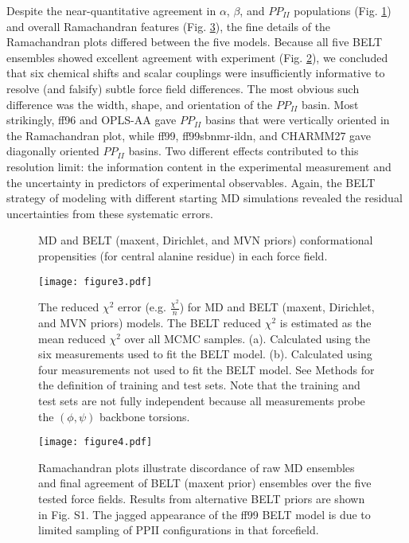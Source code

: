 \documentclass[12pt]{article}
\begin{document}
Despite the near-quantitative agreement in $\alpha$, $\beta$, and $PP_{II}$ populations (Fig. \ref{figure:ALA3}) and overall Ramachandran features (Fig. \ref{figure:Rama}), the fine details of the Ramachandran plots differed between the five models.  Because all five BELT ensembles showed excellent agreement with experiment (Fig. \ref{figure:ChiSquared}), we concluded that six chemical shifts and scalar couplings were insufficiently informative to resolve (and falsify) subtle force field differences.  The most obvious such difference was the width, shape, and orientation of the $PP_{II}$ basin.  Most strikingly, ff96 and OPLS-AA gave $PP_{II}$ basins that were vertically oriented in the Ramachandran plot, while ff99, ff99sbnmr-ildn, and CHARMM27 gave diagonally oriented $PP_{II}$ basins.  Two different effects contributed to this resolution limit: the information content in the experimental measurement and the uncertainty in predictors of experimental observables. Again, the BELT strategy of modeling with 
different starting MD simulations revealed the residual uncertainties from these systematic errors.


\begin{figure}

\caption{
MD and BELT (maxent, Dirichlet, and MVN priors) conformational propensities (for central alanine residue) in each force field.  
}
\label{figure:ALA3}
\end{figure}


\begin{figure}

\texttt{[image: figure3.pdf]}

\caption{
The reduced $\chi^2$ error (e.g. $\frac{\chi^2}{n}$) for MD and BELT (maxent, Dirichlet, and MVN priors) models.  The BELT reduced $\chi^2$ is estimated as the mean reduced $\chi^2$ over all MCMC samples.  (a).  Calculated using the six measurements used to fit the BELT model.  (b).  Calculated using four measurements not used to fit the BELT model.  See Methods for the definition of training and test sets.  Note that the training and test sets are not fully independent because all measurements probe the $(\phi, \psi)$ backbone torsions.
}
\label{figure:ChiSquared}
\end{figure}


\begin{figure}

\texttt{[image: figure4.pdf]}

\caption{
Ramachandran plots illustrate discordance of raw MD ensembles and final agreement of BELT (maxent prior) ensembles over the five tested force fields. Results from alternative BELT priors are shown in Fig. S1.  The jagged appearance of the ff99 BELT model is due to limited sampling of PPII configurations in that forcefield.  
}
\label{figure:Rama}
\end{figure}
\end{document}
